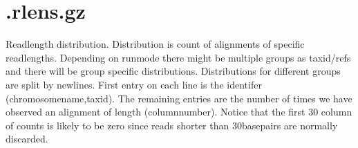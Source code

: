 \documentclass[10pt]{article}
\begin{document}
\section{.rlens.gz}
Readlength distribution. Distribution is count of alignments of
specific readlengths. Depending on runmode there might be multiple
groups as taxid/refs and there will be group specific
distributions. Distributions for different groups are split by
newlines. First entry on each line is the identifer
(chromosomename,taxid). The remaining entries are the number of times
we have observed an alignment of length (columnnumber). Notice that
the first 30 column of counts is likely to be zero since reads shorter
than 30basepairs are normally discarded.
\end{document}
